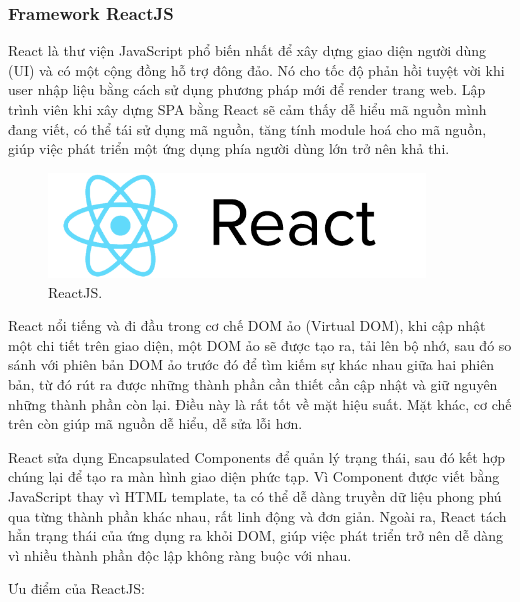 \subsubsection{Framework ReactJS}
React là thư viện JavaScript phổ biến nhất để xây dựng giao diện người dùng (UI) và có một cộng đồng hỗ trợ đông
đảo. Nó cho tốc độ phản hồi tuyệt vời khi user nhập liệu bằng cách sử dụng phương pháp mới để render trang web. Lập trình viên khi xây dựng SPA bằng React sẽ cảm thấy dễ hiểu mã nguồn mình đang viết, có thể tái sử dụng mã nguồn, tăng tính module hoá cho mã nguồn, giúp việc phát triển một ứng dụng phía người dùng lớn trở nên khả thi. \par
\begin{figure}[h!]
    \begin{center}
        \includegraphics[width=10cm]{Image/Technical/react_logo.png}
        \caption{ReactJS.}
        \label{reactjs}
    \end{center}
\end{figure}
React nổi tiếng và đi đầu trong cơ chế DOM ảo (Virtual DOM), khi cập nhật một chi tiết trên giao diện, một DOM ảo sẽ được tạo ra, tải lên bộ nhớ, sau đó so sánh với phiên bản DOM ảo trước đó để tìm kiếm sự khác nhau giữa hai phiên bản, từ đó rút ra được những thành phần cần thiết cần cập nhật và giữ nguyên những thành phần còn lại. Điều này là rất tốt về mặt hiệu suất. Mặt khác, cơ chế trên còn giúp mã nguồn dễ hiểu, dễ sửa lỗi hơn. \par
React sửa dụng Encapsulated Components để quản lý trạng thái, sau đó kết hợp chúng lại để tạo ra màn hình giao diện phức tạp. Vì Component được viết bằng JavaScript thay vì HTML template, ta có thể dễ dàng truyền dữ liệu phong phú qua từng thành phần khác nhau, rất linh động và đơn giản. Ngoài ra, React tách hẳn trạng thái của ứng dụng ra khỏi DOM, giúp việc phát triển trở nên dễ dàng vì nhiều thành phần độc lập không ràng buộc với nhau.\par
Ưu điểm của ReactJS:
